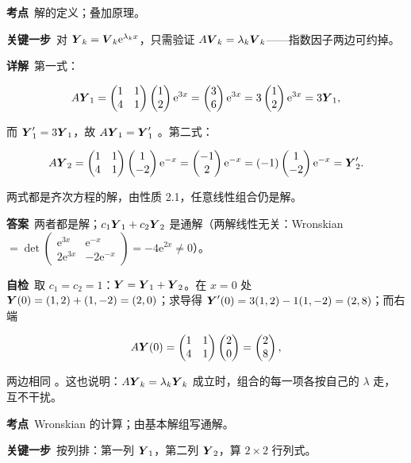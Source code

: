 \documentclass[11pt]{ctexart}
\renewcommand{\qbreak}{\needspace{0.26\textheight}}
\newcommand{\qpagebreak}{\needspace{0.92\textheight}}
\newcommand{\mat}[1]{\begin{pmatrix}#1\end{pmatrix}}
\begin{document}
\textbf{考点}\ 解的定义；叠加原理。

\textbf{关键一步}\ 对 $\boldsymbol{Y}_k=\boldsymbol{V}_k\mathrm{e}^{\lambda_k x}$，只需验证 $A\boldsymbol{V}_k=\lambda_k\boldsymbol{V}_k$——指数因子两边可约掉。

\textbf{详解}\ 第一式：

\[
A\vect{Y}_1=\mat{1&1\\4&1}\mat{1\\2}\mathrm{e}^{3x}=\mat{3\\6}\mathrm{e}^{3x}=3\mat{1\\2}\mathrm{e}^{3x}=3\vect{Y}_1 ,
\]

而 $\boldsymbol{Y}_1'=3\boldsymbol{Y}_1$，故 $A\boldsymbol{Y}_1=\boldsymbol{Y}_1'$ 。第二式：

\[
A\vect{Y}_2=\mat{1&1\\4&1}\mat{1\\-2}\mathrm{e}^{-x}=\mat{-1\\2}\mathrm{e}^{-x}=(-1)\mat{1\\-2}\mathrm{e}^{-x}=\vect{Y}_2' .
\]

两式都是齐次方程的解，由性质 2.1，任意线性组合仍是解。

\textbf{答案}\ 两者都是解；$c_1\boldsymbol{Y}_1+c_2\boldsymbol{Y}_2$ 是通解（两解线性无关：Wronskian $=\det\mat{\mathrm{e}^{3x}&\mathrm{e}^{-x}\\2\mathrm{e}^{3x}&-2\mathrm{e}^{-x}}=-4\mathrm{e}^{2x}\neq0$）。

\textbf{自检}\ 取 $c_1=c_2=1$：$\boldsymbol{Y}=\boldsymbol{Y}_1+\boldsymbol{Y}_2$。在 $x=0$ 处 $\boldsymbol{Y}(0)=(1,2)+(1,-2)=(2,0)$；求导得 $\boldsymbol{Y}'(0)=3(1,2)-1(1,-2)=(2,8)$；而右端

\[
A\vect{Y}(0)=\mat{1&1\\4&1}\mat{2\\0}=\mat{2\\8},
\]

两边相同 。这也说明：$A\boldsymbol{Y}_k=\lambda_k\boldsymbol{Y}_k$ 成立时，组合的每一项各按自己的 $\lambda$ 走，互不干扰。

\qpagebreak
{}
\label{app:a5}

\qbreak
{}

\textbf{考点}\ Wronskian 的计算；由基本解组写通解。

\textbf{关键一步}\ 按列排：第一列 $\boldsymbol{Y}_1$，第二列 $\boldsymbol{Y}_2$，算 $2\times2$ 行列式。
\end{document}
